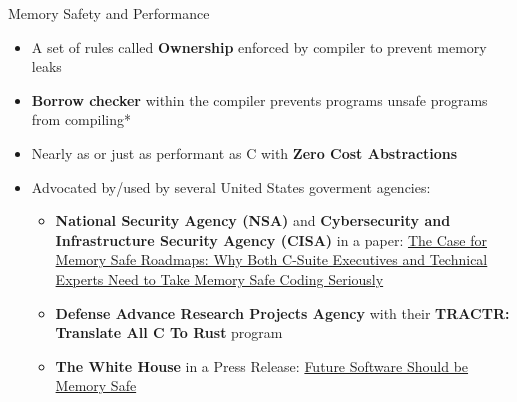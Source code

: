 \documentclass[8pt,compress]{beamer}
\newcommand\LightBold[1]{\textcolor{VSBlueLight}{\textbf{#1}}}
\newcommand\DarkBold[1]{\textcolor{VSBlueDark}{\textbf{#1}}}
\begin{document}
\begin{frame}
\begin{minipage}{0.20\textwidth}
  \end{minipage}
  \hfill
  \vspace{-8px}
  \begin{block}{Memory Safety and Performance}
    \begin{itemize}
      \item A set of rules called \DarkBold{Ownership} enforced by compiler to prevent memory leaks
      \item \DarkBold{Borrow checker} within the compiler prevents programs unsafe programs from compiling*
      \item Nearly as or just as performant as C with \DarkBold{Zero Cost Abstractions}
      \item Advocated by/used by several United States goverment agencies:
        \begin{itemize}
          \item \LightBold{National Security Agency (NSA)} and 
            \LightBold{Cybersecurity and Infrastructure Security Agency (CISA)} in a paper:
            \ul{The Case for Memory Safe Roadmaps:
            Why Both C-Suite Executives and Technical Experts
            Need to Take Memory Safe Coding Seriously}
          \item \LightBold{Defense Advance Research Projects Agency} with their \LightBold{TRACTR: Translate All C To Rust} program
          \item \LightBold{The White House} in a Press Release: \ul{Future Software Should be Memory Safe}
        \end{itemize}
    \end{itemize}
  \end{block}
\end{frame}

\end{document}
